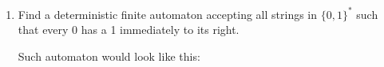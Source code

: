 \documentclass{article}
\begin{document}

    \begin{tasks}
        \begin{enumerate}
        \item \begin{problem}
            Find a deterministic finite automaton accepting all strings in \(\{0, 1\}^*\) such
            that every 0 has a 1 immediately to its right.
        \end{problem}
        
        Such automaton would look like this:
        \begin{figure}[H]
            \centering
\end{figure}
\end{enumerate}
\end{tasks}
\end{document}
